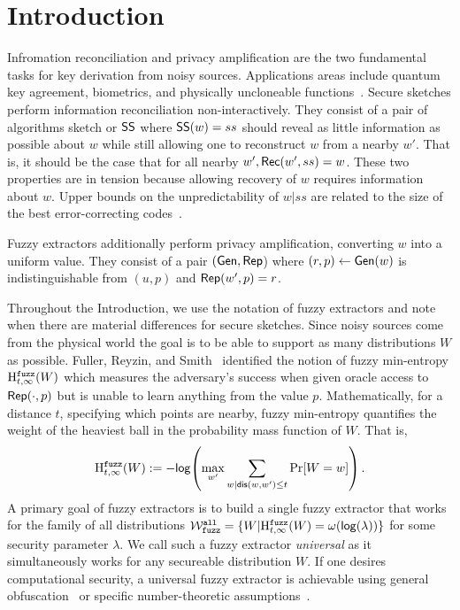 
\section{Introduction}
Infromation reconciliation and privacy amplification are the two fundamental tasks for key derivation from noisy sources.  Applications areas include quantum key agreement, biometrics, and physically uncloneable functions~\cite{bennett1988privacy,dodis2008fuzzy}. Secure sketches perform information reconciliation non-interactively.  They consist of a pair of algorithms sketch or ${\mathsf{SS}}$ where ${\mathsf{SS}}(w) = ss$ should reveal as little information as possible about $w$ while still allowing one to reconstruct $w$ from a nearby $w'$. That is, it should be the case that for all nearby $w', {\mathsf{Rec}}(w', ss) = w$.  These two properties are in tension because allowing recovery of $w$ requires information about $w$.  Upper bounds on the unpredictability of $w | ss$ are related to the size of the best error-correcting codes~\cite{dodis2008fuzzy,fuller2020computational}. 

  Fuzzy extractors additionally perform privacy amplification, converting $w$ into a uniform value.  They consist of a pair $({\mathsf{Gen}}, {\mathsf{Rep}}$) where $(r, p)\leftarrow {\ensuremath{\mathsf{Gen}}}(w)$ is indistinguishable from $(u, p)$ and ${\mathsf{Rep}}(w', p) =r$.

Throughout the Introduction, we use the notation of fuzzy extractors and note when there are material differences for secure sketches.
Since noisy sources come from the physical world the goal is to be able to support as many distributions $W$ as possible.  Fuller, Reyzin, and Smith~\cite{fuller2016fuzzy,fuller2020fuzzy} identified the notion of fuzzy min-entropy $\mathrm{H}^{\mathtt{fuzz}}_{t,\infty}(W)$ which measures the adversary's success when given oracle access to ${\mathsf{Rep}}(\cdot, p)$ but is unable to learn anything from the value  $p$.  Mathematically, for a distance $t$, specifying which points are nearby, fuzzy min-entropy quantifies the weight of the heaviest ball in the probability mass function of $W$.  That is, 
\[
\mathrm{H}^{\mathtt{fuzz}}_{t,\infty}(W):= -\mathsf{log}\!\left(\max_{w'} \sum_{w | \mathsf{dis}(w, w')\le t} \Pr[W=w]\right).
\]A primary goal of fuzzy extractors is to build a single fuzzy extractor that works for the family of all distributions $\mathcal{W}_{\mathtt{fuzz}}^{\mathtt{all}} = \{ W | \mathrm{H}^{\mathtt{fuzz}}_{t,\infty}(W) = \omega(\mathsf{log}\!\left(\lambda\right))\}$ for some security parameter $\lambda$.  We call such a fuzzy extractor \emph{universal} as it simultaneously works for any secureable distribution $W$. 
If one desires computational security, a universal fuzzy extractor is achievable using general obfuscation~\cite{BarakBCKPS13,BitanskyCKP14,bitansky2017virtual} or specific number-theoretic assumptions~\cite{galbraith2019obfuscated}. 


